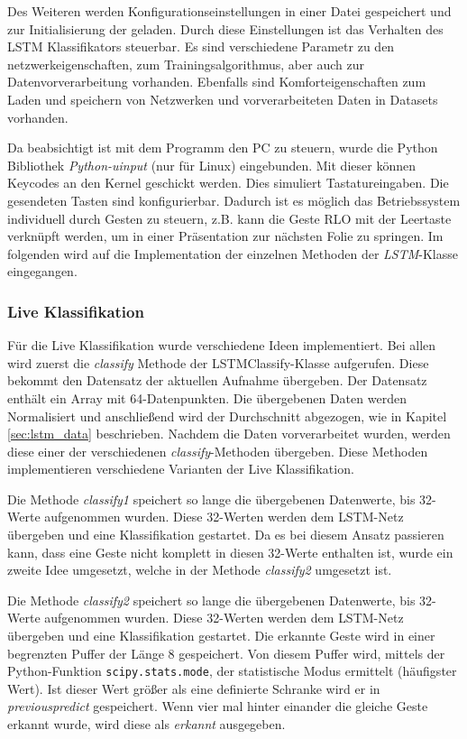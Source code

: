Des Weiteren werden Konfigurationseinstellungen in einer Datei gespeichert und
zur Initialisierung der geladen. Durch diese Einstellungen ist das Verhalten des
\ac{LSTM} Klassifikators steuerbar. Es sind verschiedene Parametr zu den
netzwerkeigenschaften, zum Trainingsalgorithmus, aber auch zur
Datenvorverarbeitung vorhanden. Ebenfalls sind Komforteigenschaften zum Laden
und speichern von Netzwerken und vorverarbeiteten Daten in Datasets vorhanden.

Da beabsichtigt ist mit dem Programm den PC zu steuern, wurde die Python
Bibliothek \textit{Python-uinput} (nur für Linux) eingebunden. Mit dieser können
Keycodes an den Kernel geschickt werden. Dies simuliert Tastatureingaben. Die
gesendeten Tasten sind konfigurierbar. Dadurch ist es möglich das Betriebssystem
individuell durch Gesten zu steuern, z.B. kann die Geste \ac{RLO} mit der
Leertaste verknüpft werden, um in einer Präsentation zur nächsten Folie zu
springen.
Im folgenden wird auf die Implementation der einzelnen Methoden der
\textit{LSTM}-Klasse eingegangen.

\subsubsection*{Live Klassifikation} 
Für die Live Klassifikation wurde verschiedene Ideen implementiert.
Bei allen wird zuerst die \textit{classify} Methode der LSTMClassify-Klasse aufgerufen.
Diese bekommt den Datensatz der aktuellen Aufnahme übergeben.
Der Datensatz enthält ein Array mit 64-Datenpunkten. Die übergebenen Daten
werden Normalisiert und anschließend wird der Durchschnitt abgezogen, wie in
Kapitel \autoref{sec:lstm_data} beschrieben. Nachdem die Daten vorverarbeitet
wurden, werden diese einer der verschiedenen \textit{classify}-Methoden
übergeben. Diese Methoden implementieren verschiedene Varianten der Live
Klassifikation.

Die Methode \textit{classify1} speichert so lange die übergebenen Datenwerte, 
bis 32-Werte aufgenommen wurden. Diese 32-Werten werden dem \ac{LSTM}-Netz 
übergeben und eine Klassifikation gestartet. Da es bei diesem Ansatz passieren kann, 
dass eine Geste nicht komplett in diesen 32-Werte enthalten ist, wurde ein zweite 
Idee umgesetzt, welche in der Methode \textit{classify2} umgesetzt ist.

Die Methode \textit{classify2} speichert so lange die übergebenen Datenwerte,
bis 32-Werte aufgenommen wurden. Diese 32-Werten werden dem \ac{LSTM}-Netz
übergeben und eine Klassifikation gestartet. Die erkannte Geste wird in einer
begrenzten Puffer der Länge 8 gespeichert. Von diesem Puffer wird, mittels der
Python-Funktion \texttt{scipy.stats.mode}, der statistische Modus ermittelt
(häufigster Wert). Ist dieser Wert größer als eine definierte Schranke wird er
in \textit{previouspredict} gespeichert. Wenn vier mal hinter einander die
gleiche Geste erkannt wurde, wird diese als \textit{erkannt} ausgegeben.

